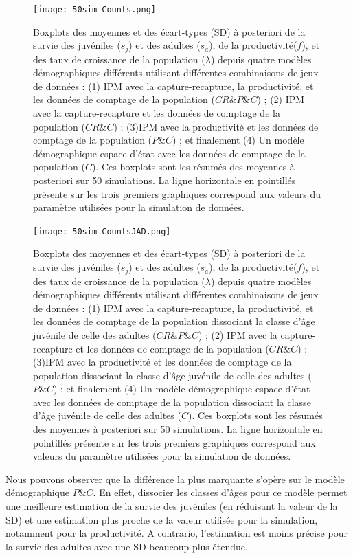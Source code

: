 \documentclass[12pt,a4paper]{article}
\begin{document}
\begin{figure}[!t]
\texttt{[image: 50sim\_Counts.png]}
\caption{Boxplots des moyennes et des écart-types (SD) à posteriori de la survie des juvéniles ($s_j$) et des adultes ($s_a$), de la productivité($f$), et des taux de croissance de la population ($\lambda$) depuis quatre modèles démographiques différents utilisant différentes combinaisons de jeux de données : (1) IPM avec la capture-recapture, la productivité, et les données de comptage de la population ($CR \& P \& C$) ; (2) IPM avec la capture-recapture et les données de comptage de la population ($CR \& C$) ; (3)IPM avec la productivité et les données de comptage de la population ($P \& C$) ; et finalement (4) Un modèle démographique espace d'état avec les données de comptage de la population ($C$). Ces boxplots sont les résumés des moyennes à posteriori sur 50 simulations. La ligne horizontale en pointillés présente sur les trois premiers graphiques correspond aux valeurs du paramètre utilisées pour la simulation de données.}
\end{figure}
\begin{figure}[!t]
\texttt{[image: 50sim\_CountsJAD.png]}
\caption{Boxplots des moyennes et des écart-types (SD) à posteriori de la survie des juvéniles ($s_j$) et des adultes ($s_a$), de la productivité($f$), et des taux de croissance de la population ($\lambda$) depuis quatre modèles démographiques différents utilisant différentes combinaisons de jeux de données : (1) IPM avec la capture-recapture, la productivité, et les données de comptage de la population dissociant la classe d'âge juvénile de celle des adultes ($CR \& P \& C$) ; (2) IPM avec la capture-recapture et les données de comptage de la population ($CR \& C$) ; (3)IPM avec la productivité et les données de comptage de la population dissociant la classe d'âge juvénile de celle des adultes ($P \& C$) ; et finalement (4) Un modèle démographique espace d'état avec les données de comptage de la population dissociant la classe d'âge juvénile de celle des adultes ($C$). Ces boxplots sont les résumés des moyennes à posteriori sur 50 simulations. La ligne horizontale en pointillés présente sur les trois premiers graphiques correspond aux valeurs du paramètre utilisées pour la simulation de données.}
\end{figure}

Nous pouvons observer que la différence la plus marquante s'opère sur le modèle démographique $P \& C$. En effet, dissocier les classes d'âges pour ce modèle permet une meilleure estimation de la survie des juvéniles (en réduisant la valeur de la SD) et une estimation plus proche de la valeur utilisée pour la simulation, notamment pour la productivité. A contrario, l'estimation est moins précise pour la survie des adultes avec une SD beaucoup plus étendue.
\end{document}
